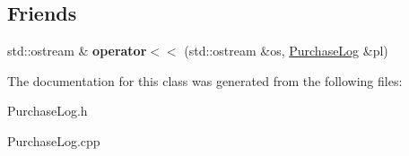 \subsection*{Friends}
\begin{DoxyCompactItemize}
\item 
\mbox{\label{classPurchaseLog_a49c8f4f31115140c5700334bd9933525}} 
std\+::ostream \& {\bfseries operator$<$$<$} (std\+::ostream \&os, \mbox{\hyperlink{classPurchaseLog}{Purchase\+Log}} \&pl)
\end{DoxyCompactItemize}


The documentation for this class was generated from the following files\+:\begin{DoxyCompactItemize}
\item 
Purchase\+Log.\+h\item 
Purchase\+Log.\+cpp\end{DoxyCompactItemize}

